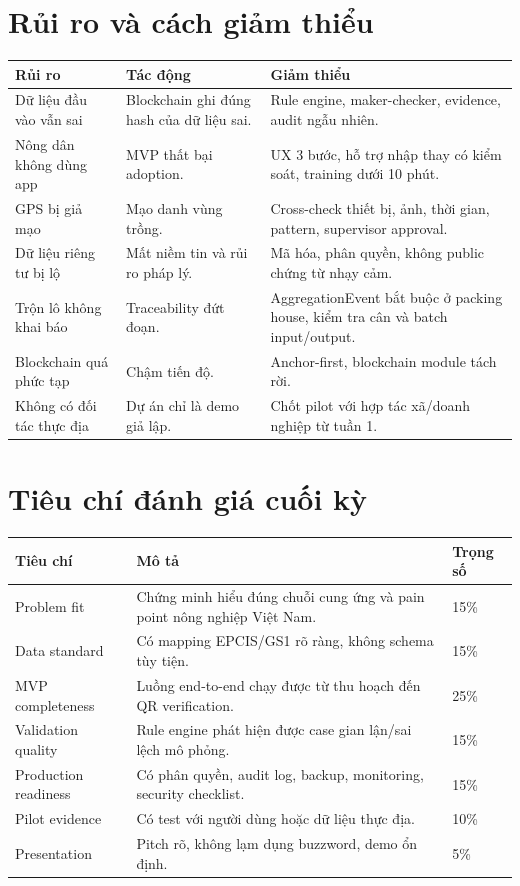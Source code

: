 \documentclass[12pt,a4paper]{article}
\begin{document}
\section{Rủi ro và cách giảm thiểu}

\begin{longtable}{p{4cm}p{5cm}p{4.5cm}}
\toprule
\textbf{Rủi ro} & \textbf{Tác động} & \textbf{Giảm thiểu} \\
\midrule
\endhead
Dữ liệu đầu vào vẫn sai & Blockchain ghi đúng hash của dữ liệu sai. & Rule engine, maker-checker, evidence, audit ngẫu nhiên. \\
\addlinespace
Nông dân không dùng app & MVP thất bại adoption. & UX 3 bước, hỗ trợ nhập thay có kiểm soát, training dưới 10 phút. \\
\addlinespace
GPS bị giả mạo & Mạo danh vùng trồng. & Cross-check thiết bị, ảnh, thời gian, pattern, supervisor approval. \\
\addlinespace
Dữ liệu riêng tư bị lộ & Mất niềm tin và rủi ro pháp lý. & Mã hóa, phân quyền, không public chứng từ nhạy cảm. \\
\addlinespace
Trộn lô không khai báo & Traceability đứt đoạn. & AggregationEvent bắt buộc ở packing house, kiểm tra cân và batch input/output. \\
\addlinespace
Blockchain quá phức tạp & Chậm tiến độ. & Anchor-first, blockchain module tách rời. \\
\addlinespace
Không có đối tác thực địa & Dự án chỉ là demo giả lập. & Chốt pilot với hợp tác xã/doanh nghiệp từ tuần 1. \\
\bottomrule
\end{longtable}

\section{Tiêu chí đánh giá cuối kỳ}

\begin{longtable}{p{4cm}p{7cm}p{2.5cm}}
\toprule
\textbf{Tiêu chí} & \textbf{Mô tả} & \textbf{Trọng số} \\
\midrule
\endhead
Problem fit & Chứng minh hiểu đúng chuỗi cung ứng và pain point nông nghiệp Việt Nam. & 15\% \\
\addlinespace
Data standard & Có mapping EPCIS/GS1 rõ ràng, không schema tùy tiện. & 15\% \\
\addlinespace
MVP completeness & Luồng end-to-end chạy được từ thu hoạch đến QR verification. & 25\% \\
\addlinespace
Validation quality & Rule engine phát hiện được case gian lận/sai lệch mô phỏng. & 15\% \\
\addlinespace
Production readiness & Có phân quyền, audit log, backup, monitoring, security checklist. & 15\% \\
\addlinespace
Pilot evidence & Có test với người dùng hoặc dữ liệu thực địa. & 10\% \\
\addlinespace
Presentation & Pitch rõ, không lạm dụng buzzword, demo ổn định. & 5\% \\
\bottomrule
\end{longtable}
\end{document}
